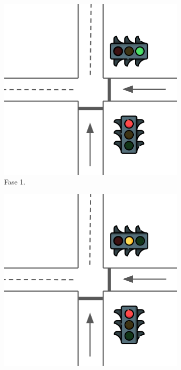 \begin{figure}[ht]
    \centering
    \begin{subfigure}[t]{0.32\textwidth}
        \centering
        \includegraphics[width=\textwidth]{report/images/semaforossimple1.png}
        \caption{Fase 1.}
        \label{fig:semaforo-simple-1}
    \end{subfigure}
    \hfill
    \begin{subfigure}[t]{0.32\textwidth}
        \centering
        \includegraphics[width=\textwidth]{report/images/semaforossimple2.png}

\end{subfigure}
\end{figure}
